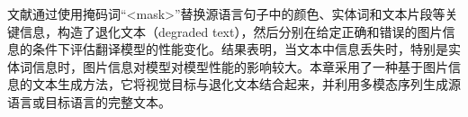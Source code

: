 文献\cite{53_caglayan-etal-2019-probing}通过使用掩码词“<mask>”替换源语言句子中的颜色、实体词和文本片段等关键信息，构造了退化文本（degraded text），然后分别在给定正确和错误的图片信息的条件下评估翻译模型的性能变化。结果表明，当文本中信息丢失时，特别是实体词信息时，图片信息对模型对模型性能的影响较大。本章采用了一种基于图片信息的文本生成方法，它将视觉目标与退化文本结合起来，并利用多模态序列生成源语言或目标语言的完整文本。


